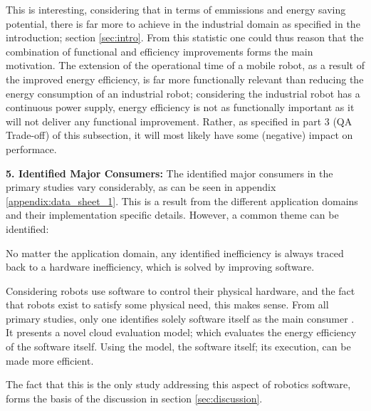 This is interesting, considering that in terms of emmissions and energy saving potential, there is far more to achieve in the industrial domain
as specified in the introduction; section \ref{sec:intro}.
From this statistic one could thus reason that the combination of functional and efficiency improvements forms the main motivation. 
The extension of the operational time of a mobile robot, as a result of the improved energy efficiency, 
is far more functionally relevant than reducing the energy consumption of an industrial robot;
considering the industrial robot has a continuous power supply, energy efficiency is not as functionally important as it will
not deliver any functional improvement. 
Rather, as specified in part 3 (QA Trade-off) of this subsection, it will most likely have some (negative) impact on performace.

\vspace{2mm}

\noindent\textbf{5. Identified Major Consumers:}
The identified major consumers in the primary studies vary considerably, as can be seen in appendix \ref{appendix:data_sheet_1}.
This is a result from the different application domains and their implementation specific details.
However, a common theme can be identified:

\vspace{2mm}

No matter the application domain, any identified inefficiency is always traced back to a hardware inefficiency, 
which is solved by improving software.

\vspace{2mm}

Considering robots use software to control their physical hardware, and the fact that robots exist to satisfy some physical need, this makes sense.
From all primary studies, only one identifies solely software itself as the main consumer \cite{hou2017novel_cloud_evaluation_model}.
It presents a novel cloud evaluation model; which evaluates the energy efficiency of the software itself.
Using the model, the software itself; its execution, can be made more efficient.

\vspace{2mm}

The fact that this is the only study addressing this aspect of robotics software, forms the basis of the discussion in section \ref{sec:discussion}.


